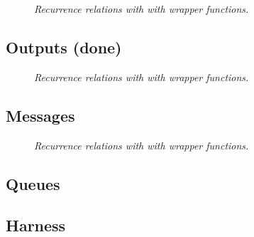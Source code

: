 \documentclass{article}
\begin{document}


\begin{figure}[H]
	\centering
	
	\caption{\it Recurrence relations with with wrapper functions.}
	\label{fig:RRwfc}
\end{figure} 

\subsection{Outputs (done)}

\begin{figure}[H]
	\centering
	
	\caption{\it Recurrence relations with with wrapper functions.}
	\label{fig:RRopts}
\end{figure} 


\subsection{Messages}

\begin{figure}[H]
	\centering
	
	\caption{\it Recurrence relations with with wrapper functions.}
	\label{fig:RRmes5}
\end{figure} 

\subsection{Queues}



\subsection{Harness}
\end{document}
